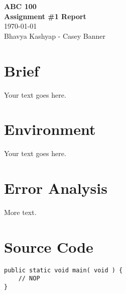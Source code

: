 \documentclass[10pt]{article} %
\def\groupmembers#1#2{{#1 - #2}}
\def\finaltitle#1#2#3#4{\begin{center}{{\Large \textbf{#1\\#2}}\\#3\\{\small#4}}\end{center}}
\def\brief{\section*{Brief}}
\def\environment{\section*{Environment}}
\def\nsection#1{\section*{#1}}
\def\nsource#1{\newpage\section*{#1}}
\def\courseident {{ABC}}
\def\coursenumber{{100}}
\def\assignmenttitle{{Assignment \#1 Report}}
\def\fullcourse{{\courseident} {\coursenumber}}
\def\assignmentauthors{\groupmembers{Bhavya Kashyap}{Casey Banner}}
\begin{document}
\finaltitle{\fullcourse}{\assignmenttitle}{\today}{\assignmentauthors}

\brief

Your text goes here.

\environment

Your text goes here.

\nsection{Error Analysis}

More text.

\nsource{Source Code}
\begin{verbatim}
public static void main( void ) {
	// NOP
}
\end{verbatim}
\end{document}
